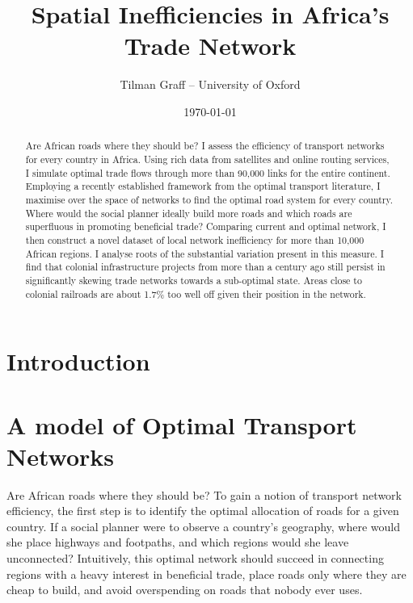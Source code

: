 \documentclass[11pt, oneside]{article}   	%
\title{Spatial Inefficiencies in Africa's Trade Network}
\author{Tilman Graff -- University of Oxford}
\date{\today}
\begin{document}

\maketitle
\begin{abstract}
  Are African roads where they should be? I assess the efficiency of transport networks for every country in Africa. Using rich data from satellites and online routing services, I simulate optimal trade flows through more than 90,000 links for the entire continent. Employing a recently established framework from the optimal transport literature, I maximise over the space of networks to find the optimal road system for every country. Where would the social planner ideally build more roads and which roads are superfluous in promoting beneficial trade? Comparing current and optimal network, I then construct a novel dataset of local network inefficiency for more than 10,000 African regions. I analyse roots of the substantial variation present in this measure. I find that colonial infrastructure projects from more than a century ago still persist in significantly skewing trade networks towards a sub-optimal state. Areas close to colonial railroads are about 1.7\% too well off given their position in the network.
\end{abstract}



\section{Introduction}

\section{A model of Optimal Transport Networks}

Are African roads where they should be? To gain a notion of transport network efficiency, the first step is to identify the optimal allocation of roads for a given country. If a social planner were to observe a country's geography, where would she place highways and footpaths, and which regions would she leave unconnected? Intuitively, this optimal network should succeed in connecting regions with a heavy interest in beneficial trade, place roads only where they are cheap to build, and avoid overspending on roads that nobody ever uses.
\end{document}
